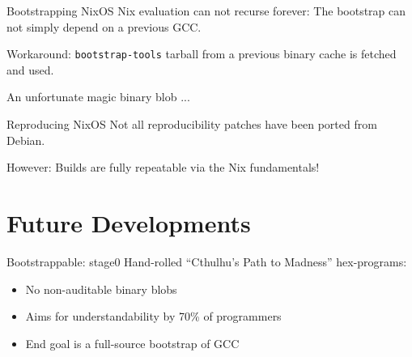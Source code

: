 \documentclass[12pt]{beamer}
\begin{document}

  \begin{frame}{Bootstrapping NixOS}
    Nix evaluation can not recurse forever: The bootstrap can not
    simply depend on a previous GCC.

    Workaround: \texttt{bootstrap-tools} tarball from a previous
    binary cache is fetched and used.

    An unfortunate magic binary blob ...
  \end{frame}

  \begin{frame}{Reproducing NixOS}
    Not all reproducibility patches have been ported from Debian.

    However: Builds are fully repeatable via the Nix fundamentals!
  \end{frame}

  \section{Future Developments}

  \begin{frame}{Bootstrappable: stage0}
    Hand-rolled ``Cthulhu's Path to Madness'' hex-programs:

    \begin{itemize}
    \item No non-auditable binary blobs
    \item Aims for understandability by 70\% of programmers
    \item End goal is a full-source bootstrap of GCC
    \end{itemize}
  \end{frame}
\end{document}
